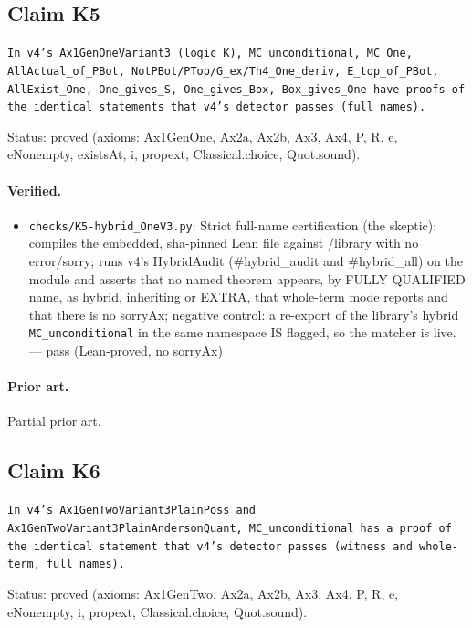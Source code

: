 \documentclass{article}
\begin{document}
\subsection*{Claim K5}

\texttt{In v4's Ax1GenOneVariant3 (logic K), MC\_unconditional, MC\_One, AllActual\_of\_PBot, NotPBot/PTop/G\_ex/Th4\_One\_deriv, E\_top\_of\_PBot, AllExist\_One, One\_gives\_S, One\_gives\_Box, Box\_gives\_One have proofs of the identical statements that v4's detector passes (full names).}

Status: proved (axioms: Ax1GenOne, Ax2a, Ax2b, Ax3, Ax4, P, R, e, eNonempty, existsAt, i, propext, Classical.choice, Quot.sound).

\paragraph{Verified.}
\begin{itemize}
\item \texttt{checks/K5-hybrid\_OneV3.py}: Strict full-name certification (the skeptic): compiles the embedded, sha-pinned Lean file against /library with no error/sorry; runs v4's HybridAudit (\#hybrid\_audit and \#hybrid\_all) on the module and asserts that no named theorem appears, by FULLY QUALIFIED name, as hybrid, inheriting or EXTRA, that whole-term mode reports and that there is no sorryAx; negative control: a re-export of the library's hybrid \texttt{MC\_unconditional} in the same namespace IS flagged, so the matcher is live. --- pass (Lean-proved, no sorryAx)
\end{itemize}

\paragraph{Prior art.} Partial prior art.

\subsection*{Claim K6}

\texttt{In v4's Ax1GenTwoVariant3PlainPoss and Ax1GenTwoVariant3PlainAndersonQuant, MC\_unconditional has a proof of the identical statement that v4's detector passes (witness and whole-term, full names).}

Status: proved (axioms: Ax1GenTwo, Ax2a, Ax2b, Ax3, Ax4, P, R, e, eNonempty, i, propext, Classical.choice, Quot.sound).
\end{document}
